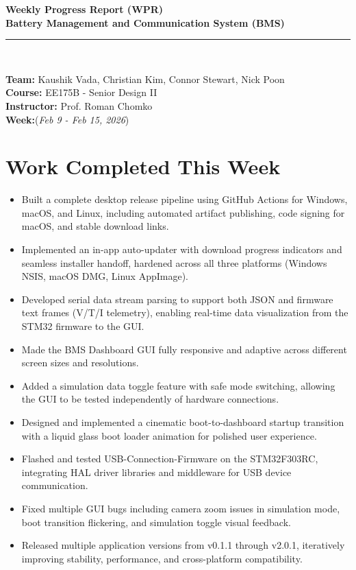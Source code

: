 \documentclass[12pt]{article}
\begin{document}
\begin{center}
    {\Large \textbf{Weekly Progress Report (WPR)}} \\[6pt]
    {\large \textbf{Battery Management and Communication System (BMS)}} \\[2pt]
    \rule{0.8\textwidth}{0.5pt} \\[6pt]
\end{center}

\noindent
\textbf{Team:} Kaushik Vada, Christian Kim, Connor Stewart, Nick Poon \\[3pt]
\textbf{Course:} EE175B - Senior Design II \\
\textbf{Instructor:} Prof. Roman Chomko \\
\textbf{Week:}(\textit{Feb 9 - Feb 15, 2026}) \\[8pt]

\vspace{1em}

\section{Work Completed This Week}
\begin{itemize}[leftmargin=1cm]
    \item Built a complete desktop release pipeline using GitHub Actions for Windows, macOS, and Linux, including automated artifact publishing, code signing for macOS, and stable download links.
    \item Implemented an in-app auto-updater with download progress indicators and seamless installer handoff, hardened across all three platforms (Windows NSIS, macOS DMG, Linux AppImage).
    \item Developed serial data stream parsing to support both JSON and firmware text frames (V/T/I telemetry), enabling real-time data visualization from the STM32 firmware to the GUI.
    \item Made the BMS Dashboard GUI fully responsive and adaptive across different screen sizes and resolutions.
    \item Added a simulation data toggle feature with safe mode switching, allowing the GUI to be tested independently of hardware connections.
    \item Designed and implemented a cinematic boot-to-dashboard startup transition with a liquid glass boot loader animation for polished user experience.
    \item Flashed and tested USB-Connection-Firmware on the STM32F303RC, integrating HAL driver libraries and middleware for USB device communication.
    \item Fixed multiple GUI bugs including camera zoom issues in simulation mode, boot transition flickering, and simulation toggle visual feedback.
    \item Released multiple application versions from v0.1.1 through v2.0.1, iteratively improving stability, performance, and cross-platform compatibility.
\end{itemize}
\end{document}
